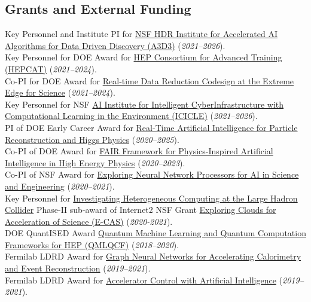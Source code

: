 \documentclass{res}
\newcommand{\MarginText}[1]{\section{#1}\vspace{10pt}}
\begin{document}
\begin{resume}
  \MarginText{Grants and External Funding}
  Key Personnel and Institute PI for \href{https://www.nsf.gov/awardsearch/showAward?AWD_ID=2117997&HistoricalAwards=false}{NSF HDR Institute for Accelerated AI Algorithms for Data Driven Discovery (A3D3)} (\textit{2021--2026}).\\
  Key Personnel for DOE Award for \href{https://science.osti.gov/-/media/hep/pdf/Awards/HEP_instrumentation_awards_list.pdf}{HEP Consortium for Advanced Training (HEPCAT)} (\textit{2021--2024}).\\
  Co-PI for DOE Award for \href{https://science.osti.gov/-/media/ascr/pdf/funding/2021/Data_Reduction_Awards.pdf}{Real‐time Data Reduction Codesign at the Extreme Edge for Science} (\textit{2021--2024}).\\
  Key Personnel for NSF \href{https://www.nsf.gov/awardsearch/showAward?AWD_ID=2112606&HistoricalAwards=false}{AI Institute for Intelligent CyberInfrastructure with Computational Learning in the Environment (ICICLE)} (\textit{2021--2026}).\\
  PI of DOE Early Career Award for \href{https://science.osti.gov/-/media/early-career/pdf/FY20_DOE_SC_Early_Career_Research_Program_Abstracts.pdf}{Real-Time Artificial Intelligence for Particle Reconstruction and Higgs Physics} (\textit{2020--2025}).\\
  Co-PI of DOE Award for \href{https://science.osti.gov/-/media/ascr/pdf/programdocuments/docs/2020/List_of_Awards_FAIR_Data.pdf}{FAIR Framework for Physics-Inspired Artificial Intelligence in High Energy Physics} (\textit{2020--2023}).\\
  Co-PI of NSF Award for \href{https://nsf.gov/awardsearch/showAward?AWD_ID=2005369}{Exploring Neural Network Processors for AI in Science and Engineering} (\textit{2020--2021}).\\
  Key Personnel for \href{https://www.internet2.edu/news/detail/17957/}{Investigating Heterogeneous Computing at the Large Hadron Collider} Phase-II sub-award of Internet2 NSF Grant \href{https://www.nsf.gov/awardsearch/showAward?AWD_ID=1904444}{Exploring Clouds for Acceleration of Science (E-CAS)} (\textit{2020-2021}).\\
  DOE QuantISED Award \href{https://pamspublic.science.energy.gov/WebPAMSExternal/Interface/Common/ViewPublicAbstract.aspx?rv=1f7d4729-6f93-40bd-a55f-c108545b1ea9&rtc=24&PRoleId=10}{Quantum Machine Learning and Quantum Computation Frameworks for HEP (QMLQCF)} (\textit{2018--2020}).\\
  Fermilab LDRD Award for \href{https://ldrd.fnal.gov/subdir/FNAL-LDRD-2019-017-D1.pdf}{Graph Neural Networks for Accelerating Calorimetry and Event Reconstruction} (\textit{2019--2021}).\\
  Fermilab LDRD Award for \href{https://ldrd.fnal.gov/subdir/FNAL-LDRD-2019-027-D1.pdf}{Accelerator Control with Artificial Intelligence} (\textit{2019--2021}).


\end{resume}
\end{document}
